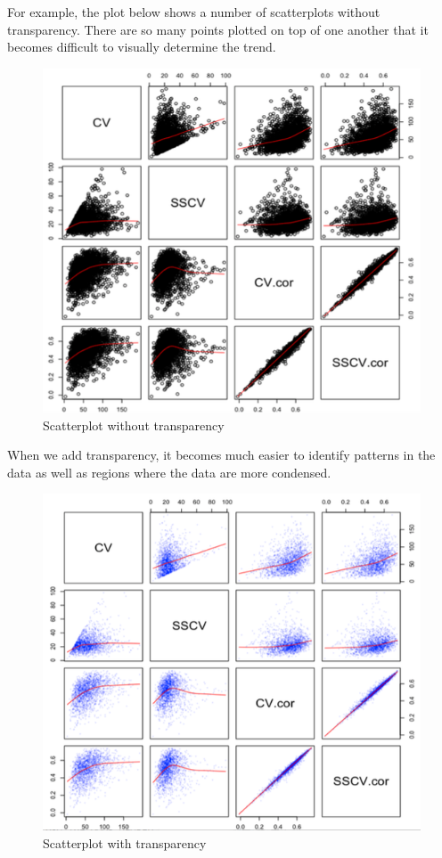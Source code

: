For example, the plot below shows a number of scatterplots without transparency. There are so many points plotted on top of one another that it becomes difficult to visually determine the trend.

\begin{figure}[H]
\begin{center}
\includegraphics[scale=0.5]{pairs.png}
\end{center}
\caption{Scatterplot without transparency}
\label{fig:pairs}
\end{figure}

When we add transparency, it becomes much easier to identify patterns in the data as well as regions where the data are more condensed.

\begin{figure}[H]
\begin{center}
\includegraphics[scale=0.5]{pairs2.png}
\end{center}
\caption{Scatterplot with transparency}
\label{fig:pairs2}
\end{figure}


